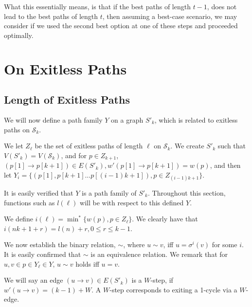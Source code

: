 \documentclass{article}
\newcommand{\edit}[1]{}%
\begin{document}
{What this essentially means, is that if the best paths of length $t-1$, does not lead to the best paths of length $t$, then assuming a best-case scenario, we may consider if we used the second best option at one of these steps and proceeded optimally.\edit{ probably rewrite a reconsider where this is placed}

\section{On Exitless Paths} \label{bounding i}

\subsection{Length of Exitless Paths}

We will now define a path family $Y$ on a graph $S'_k$, which is related to exitless paths on $\mathcal{S}_k$.

\vspace{1.75em}

We let $Z_\ell$ be the set of exitless paths of length $\ell$ on $\mathcal{S}_k$. We create $S'_k$ such that $V(S'_k) = V(\mathcal{S}_k)$, and for $p \in Z_{k+1}$, $(p[1]\to p[k+1]) \in E(S'_k), w'(p[1]\to p[k+1]) = w(p)$, and then let $Y_i = \{(p[1], p[k+1]\dots p[(i-1)k+1]), p \in Z_{(i-1)k+1}\}$.\edit{ dense/cluttered; technically already used $w'$ before}

It is easily verified that $Y$ is a path family of $S'_k$. Throughout this section, functions such as $l(\ell)$ will be with respect to this defined $Y$.\edit{ last sentence is pedantic and off-putting to me} 

\vspace{1.75em}

We define $i(\ell) = \min^* \{ w(p), p \in Z_{\ell}\}$. We clearly have that $i(nk+1 +r) = l(n)+r, 0 \leq r \leq k-1$. 

We now establish the binary relation, $\sim$, where $u \sim v$, iff $u = \sigma^i(v)$ for some $i$.\edit{ maybe should remark that this is a 1-cycle} It is easily confirmed that $\sim$ is an equivalence relation. We remark that for $u,v \in p \in Y_\ell \in Y$, $u\sim v$ holds iff $u = v$.\edit{ I wanna just write $p \in Y$, maybe reconsider notation of path families, or establish this as an abuse of notation}

We will say an edge $(u\to v) \in E(S'_k)$ is a $W$-step, if $w'(u\to v) = (k-1)+W$. A $W$-step corresponds to exiting a 1-cycle via a $W$-edge.\edit{ have not defined 1-cycles} 

}
\end{document}
